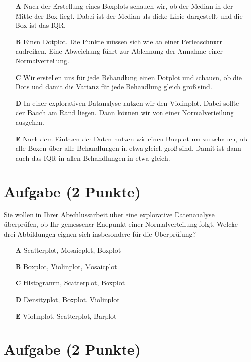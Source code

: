 \documentclass[a4paper, 9pt]{scrartcl}\usepackage[]{graphicx}\usepackage[]{xcolor}
\begin{document}
\begin{enumerate}
\item [\textbf{A} \msquare] Nach der Erstellung eines Boxplots schauen wir, ob der Median in der Mitte der Box liegt. Dabei ist der Median als dicke Linie dargestellt und die Box ist das IQR.
\item [\textbf{B} \msquare] Einen Dotplot. Die Punkte müssen sich wie an einer Perlenschnurr audreihen. Eine Abweichung führt zur Ablehnung der Annahme einer Normalverteilung.
\item [\textbf{C} \msquare] Wir erstellen uns für jede Behandlung einen Dotplot und schauen, ob die Dots und damit die Varianz für jede Behandlung gleich groß sind.
\item [\textbf{D} \msquare] In einer explorativen Datanalyse nutzen wir den Violinplot. Dabei sollte der Bauch am Rand liegen. Dann können wir von einer Normalverteilung ausgehen.
\item [\textbf{E} \msquare] Nach dem Einlesen der Daten nutzen wir einen Boxplot um zu schauen, ob alle Boxen über alle Behandlungen in etwa gleich groß sind. Damit ist dann auch das IQR in allen Behandlungen in etwa gleich.
\end{enumerate}

\section{Aufgabe \hfill (2 Punkte)}




Sie wollen in Ihrer Abschlussarbeit über eine explorative Datenanalyse überprüfen, ob Ihr gemessener Endpunkt einer Normalverteilung folgt. Welche drei Abbildungen eignen sich insbesondere für die Überprüfung?





\begin{enumerate}
\item [\textbf{A} \msquare] Scatterplot, Mosaicplot, Boxplot
\item [\textbf{B} \msquare] Boxplot, Violinplot, Mosaicplot
\item [\textbf{C} \msquare] Histogramm, Scatterplot, Boxplot
\item [\textbf{D} \msquare] Densityplot, Boxplot, Violinplot
\item [\textbf{E} \msquare] Violinplot, Scatterplot, Barplot
\end{enumerate} 

\section{Aufgabe \hfill (2 Punkte)}
\end{document}
